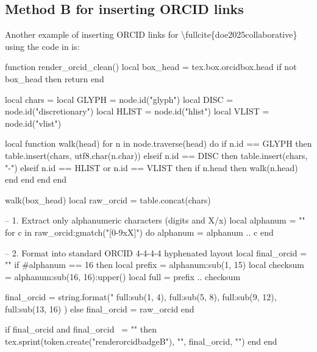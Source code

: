 \documentclass[12pt, twoside]{article}
\begin{document}
\subsection{Method B for inserting ORCID links}
\label{sec:orcidlinksMethodB}
Another example of inserting ORCID links for \textbackslash fullcite\{doe2025collaborative\} using the code in  is:
\newbox\orcidbox

\newcommand*{\renderorcidbadgeB}[1]{%
\orcidlink{#1}%
}

\begin{luacode*}
function render_orcid_clean()
  local box_head = tex.box.orcidbox.head
  if not box_head then return end

  local chars = {}
  local GLYPH = node.id("glyph")
  local DISC  = node.id("discretionary")
  local HLIST = node.id("hlist")
  local VLIST = node.id("vlist")

  local function walk(head)
    for n in node.traverse(head) do
      if n.id == GLYPH then
        table.insert(chars, utf8.char(n.char))
      elseif n.id == DISC then
        table.insert(chars, "-")
      elseif n.id == HLIST or n.id == VLIST then
        if n.head then walk(n.head) end
      end
    end
  end

  walk(box_head)
  local raw_orcid = table.concat(chars)

  -- 1. Extract only alphanumeric characters (digits and X/x)
  local alphanum = ""
  for c in raw_orcid:gmatch("[0-9xX]") do
    alphanum = alphanum .. c
  end

  -- 2. Format into standard ORCID 4-4-4-4 hyphenated layout
  local final_orcid = ""
  if #alphanum == 16 then
    local prefix = alphanum:sub(1, 15)
    local checksum = alphanum:sub(16, 16):upper()
    local full = prefix .. checksum

    final_orcid = string.format("%
      full:sub(1, 4),
      full:sub(5, 8),
      full:sub(9, 12),
      full:sub(13, 16)
    )
  else
    final_orcid = raw_orcid
  end

  if final_orcid and final_orcid ~= "" then
    tex.sprint(token.create("renderorcidbadgeB"), "{", final_orcid, "}")
  end
end
\end{luacode*}

\begingroup
\renewcommand*{\mkbibnamefamily}[1]{%
  #1%
  \edef\curridx{\the\value{listcount}}%
  \haspartannotation[author][default][\curridx]{equal}{%
    \textsuperscript{*}%
  }{}%
  \haspartannotation[author][default][\curridx]{orcid}{%
    \global\setbox\orcidbox=\hbox{\getpartannotation[author][default][\curridx]{orcid}}%
    \directlua{render_orcid_clean()}%
  }{}%
}
\end{document}
